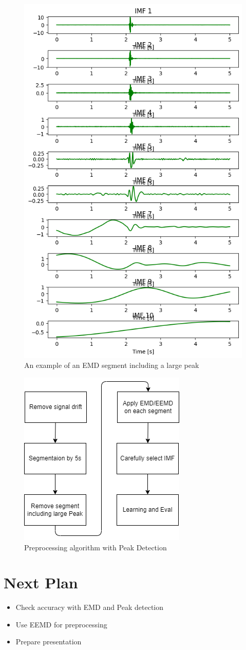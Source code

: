 \documentclass[dvipdfmx]{article}
\begin{document}
\begin{figure}[H]
    \begin{center}
    \includegraphics[width=0.5\linewidth]{./img/peak_wave.png}
    \end{center}
    \caption{An example of an EMD segment including a large peak}
    \end{figure}

\begin{figure}[H]
\begin{center}
\includegraphics[width=0.5\linewidth]{"./img/flowchart.png"}
\end{center}
\caption{Preprocessing algorithm with Peak Detection}
\end{figure}

\section{Next Plan}
\begin{itemize}
    \item Check accuracy with EMD and Peak detection
    \item Use EEMD for preprocessing
    \item Prepare presentation
\end{itemize}
\end{document}
